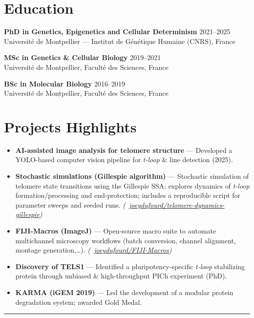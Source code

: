 \documentclass[11pt,a4paper]{article}
\begin{document}
\section*{Education}
\textbf{PhD in Genetics, Epigenetics and Cellular Determinism} \hfill 2021--2025\hspace{0.3em}\\
Université de Montpellier --- Institut de Génétique Humaine (CNRS), France

\textbf{MSc in Genetics \& Cellular Biology} \hfill 2019--2021\\
Université de Montpellier, Faculté des Sciences, France

\textbf{BSc in Molecular Biology} \hfill 2016--2019\\
Université de Montpellier, Faculté des Sciences, France\\
\vspace{2pt}

\section*{Projects Highlights}
\begin{itemize}
  \item \textbf{AI-assisted image analysis for telomere structure} — Developed a YOLO-based computer vision pipeline for \textit{t-loop} \& line detection (2025).
  \item \textbf{Stochastic simulations (Gillespie algorithm)} --- Stochastic simulation of telomere state transitions using the Gillespie SSA; explores dynamics of \textit{t-loop} formation/processing and end-protection; includes a reproducible script for parameter sweeps and seeded runs. \emph{(\faGithub~\href{https://github.com/joeydufourd/telomere-dynamics-gillespie}{joeydufourd/telomere-dynamics-gillespie})}
  \item \textbf{FIJI-Macros (ImageJ)} --- Open-source macro suite to automate multichannel microscopy workflows (batch conversion, channel alignment, montage generation,\ldots). \emph{(\faGithub~\href{https://github.com/joeydufourd/FIJI-Macros}{joeydufourd/FIJI-Macros})}
  \item \textbf{Discovery of TELS1} — Identified a pluripotency-specific \textit{t-loop} stabilizing protein through unbiased \& high-throughput PICh experiment (PhD).
  \item \textbf{KARMA (iGEM 2019)} — Led the development of a modular protein degradation system; awarded Gold Medal.
\end{itemize}
\vspace{2pt}
\noindent\textcolor{sapin}{\rule{\textwidth}{0.6pt}}
\end{document}
